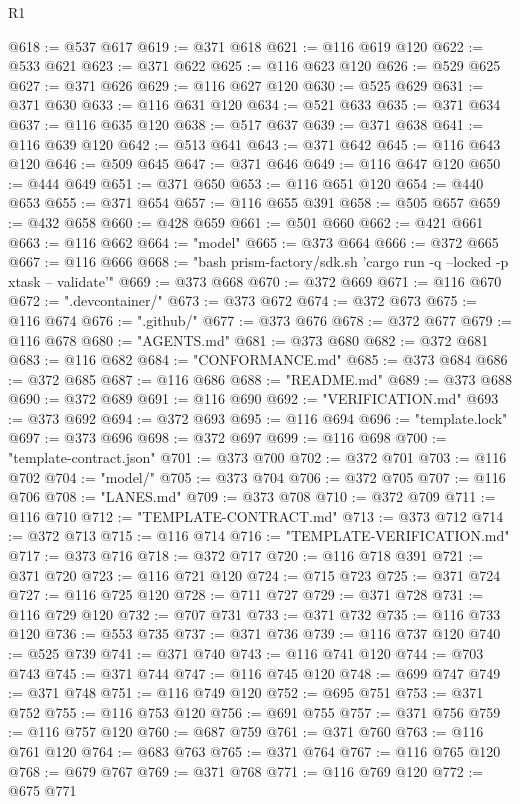 \begin{lexlean}{R1}
\begin{coremodule}
@618 := @537 @617
@619 := @371 @618
@621 := @116 @619 @120
@622 := @533 @621
@623 := @371 @622
@625 := @116 @623 @120
@626 := @529 @625
@627 := @371 @626
@629 := @116 @627 @120
@630 := @525 @629
@631 := @371 @630
@633 := @116 @631 @120
@634 := @521 @633
@635 := @371 @634
@637 := @116 @635 @120
@638 := @517 @637
@639 := @371 @638
@641 := @116 @639 @120
@642 := @513 @641
@643 := @371 @642
@645 := @116 @643 @120
@646 := @509 @645
@647 := @371 @646
@649 := @116 @647 @120
@650 := @444 @649
@651 := @371 @650
@653 := @116 @651 @120
@654 := @440 @653
@655 := @371 @654
@657 := @116 @655 @391
@658 := @505 @657
@659 := @432 @658
@660 := @428 @659
@661 := @501 @660
@662 := @421 @661
@663 := @116 @662
@664 := "model"
@665 := @373 @664
@666 := @372 @665
@667 := @116 @666
@668 := "bash prism-factory/sdk.sh 'cargo run -q --locked -p xtask -- validate'"
@669 := @373 @668
@670 := @372 @669
@671 := @116 @670
@672 := ".devcontainer/"
@673 := @373 @672
@674 := @372 @673
@675 := @116 @674
@676 := ".github/"
@677 := @373 @676
@678 := @372 @677
@679 := @116 @678
@680 := "AGENTS.md"
@681 := @373 @680
@682 := @372 @681
@683 := @116 @682
@684 := "CONFORMANCE.md"
@685 := @373 @684
@686 := @372 @685
@687 := @116 @686
@688 := "README.md"
@689 := @373 @688
@690 := @372 @689
@691 := @116 @690
@692 := "VERIFICATION.md"
@693 := @373 @692
@694 := @372 @693
@695 := @116 @694
@696 := "template.lock"
@697 := @373 @696
@698 := @372 @697
@699 := @116 @698
@700 := "template-contract.json"
@701 := @373 @700
@702 := @372 @701
@703 := @116 @702
@704 := "model/"
@705 := @373 @704
@706 := @372 @705
@707 := @116 @706
@708 := "LANES.md"
@709 := @373 @708
@710 := @372 @709
@711 := @116 @710
@712 := "TEMPLATE-CONTRACT.md"
@713 := @373 @712
@714 := @372 @713
@715 := @116 @714
@716 := "TEMPLATE-VERIFICATION.md"
@717 := @373 @716
@718 := @372 @717
@720 := @116 @718 @391
@721 := @371 @720
@723 := @116 @721 @120
@724 := @715 @723
@725 := @371 @724
@727 := @116 @725 @120
@728 := @711 @727
@729 := @371 @728
@731 := @116 @729 @120
@732 := @707 @731
@733 := @371 @732
@735 := @116 @733 @120
@736 := @553 @735
@737 := @371 @736
@739 := @116 @737 @120
@740 := @525 @739
@741 := @371 @740
@743 := @116 @741 @120
@744 := @703 @743
@745 := @371 @744
@747 := @116 @745 @120
@748 := @699 @747
@749 := @371 @748
@751 := @116 @749 @120
@752 := @695 @751
@753 := @371 @752
@755 := @116 @753 @120
@756 := @691 @755
@757 := @371 @756
@759 := @116 @757 @120
@760 := @687 @759
@761 := @371 @760
@763 := @116 @761 @120
@764 := @683 @763
@765 := @371 @764
@767 := @116 @765 @120
@768 := @679 @767
@769 := @371 @768
@771 := @116 @769 @120
@772 := @675 @771

\end{coremodule}
\end{lexlean}
